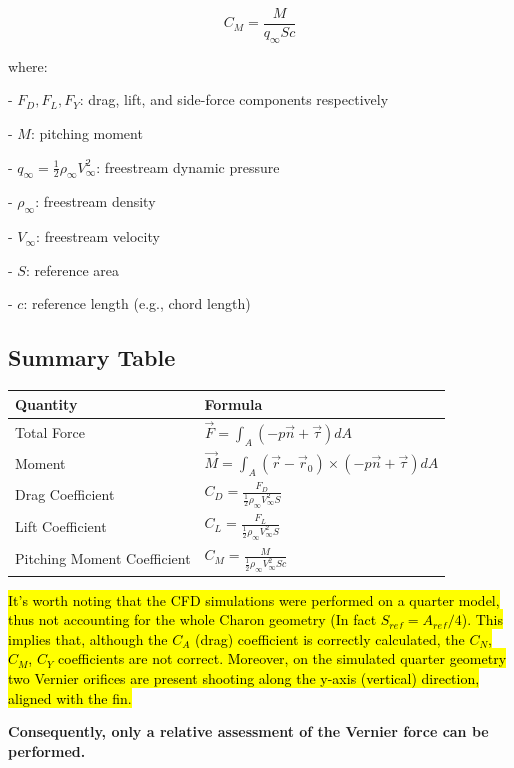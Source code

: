 \documentclass[12pt]{article}
\begin{document}
$$
C_M = \frac{M}{q_\infty S c}
$$

where:
    
- $ F_D, F_L, F_Y $: drag, lift, and side-force components respectively
    
- $ M $: pitching moment
    
- $ q_\infty = \frac{1}{2} \rho_\infty V_\infty^2 $: freestream dynamic pressure
    
- $ \rho_\infty $: freestream density
    
- $ V_\infty $: freestream velocity
    
- $ S $: reference area
    
- $ c $: reference length (e.g., chord length)

\subsection{Summary Table}

\begin{center}
\begin{tabular}{ll}
\hline
\textbf{Quantity} & \textbf{Formula} \\
\hline
Total Force & $ \vec{F} = \int_A (-p \vec{n} + \vec{\tau}) dA $ \\
Moment & $ \vec{M} = \int_A (\vec{r} - \vec{r}_0) \times (-p \vec{n} + \vec{\tau}) dA $ \\
Drag Coefficient & $ C_D = \frac{F_D}{\frac{1}{2} \rho_\infty V_\infty^2 S} $ \\
Lift Coefficient & $ C_L = \frac{F_L}{\frac{1}{2} \rho_\infty V_\infty^2 S} $ \\
Pitching Moment Coefficient & $ C_M = \frac{M}{\frac{1}{2} \rho_\infty V_\infty^2 S c} $ \\
\hline
\end{tabular}
\end{center}

\hl{It's worth noting that the CFD simulations were performed on a quarter model, thus not accounting for the whole Charon geometry (In fact $S_{ref} = A_{ref}/4$). This implies that, although the $C_A$ (drag) coefficient is correctly calculated, the $C_N$, $C_M$, $C_Y$ coefficients are not correct. Moreover, on the simulated quarter geometry two Vernier orifices are present shooting along the y-axis (vertical) direction, aligned with the fin.}

\textbf{Consequently, only a relative assessment of the Vernier force can be performed.}
\end{document}
